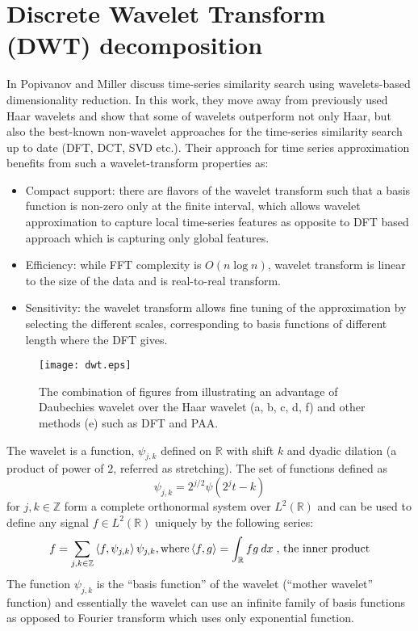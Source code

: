 \section{Discrete Wavelet Transform (DWT) decomposition}
In \cite{citeulike:3734066} Popivanov and Miller discuss time-series similarity search using wavelets-based dimensionality reduction. In this work, they move away from previously used Haar wavelets \cite{citeulike:4384535} and show that some of wavelets outperform not only Haar, but also the best-known non-wavelet approaches for the time-series similarity search up to date (DFT, DCT, SVD etc.). Their approach for time series approximation benefits from such a wavelet-transform properties as:
\begin{itemize}
	\item{Compact support: there are flavors of the wavelet transform such that a basis function is non-zero only at the finite interval, which allows wavelet approximation to capture local time-series features as opposite to DFT based approach which is capturing only global features.}
	\item{Efficiency: while FFT complexity is $O(n \log{n})$, wavelet transform is linear to the size of the data and is real-to-real transform.}
	\item{Sensitivity: the wavelet transform allows fine tuning of the approximation by selecting the different scales, corresponding to basis functions of different length where the DFT gives.}
\end{itemize}

\begin{figure}[tbp]
   \centering
   \texttt{[image: dwt.eps]}
   \caption{The combination of figures from \cite{citeulike:3734066} illustrating an advantage of Daubechies wavelet over the Haar wavelet (a, b, c, d, f) and other methods (e) such as DFT and PAA.}
   \label{fig:dwt}
\end{figure} 

The wavelet is a function, $\psi_{j,k}$ defined on $\mathbb{R}$ with shift $k$ and dyadic dilation (a product of power of $2$, referred as stretching). The set of functions defined as
\begin{equation}
\psi_{j,k} = 2^{j/2} \psi \left( 2^{j}t - k \right)  
\label{eq:wavelet}
\end{equation} 
for $j, k \in \mathbb{Z}$ form a complete orthonormal system over $L^{2}(\mathbb{R})$ and can be used to define any signal $f \in L^{2}(\mathbb{R})$ uniquely by the following series: 
\begin{equation}
f = \sum_{j, k \in \mathbb{Z}} \left\langle f, \psi_{j,k} \right\rangle  \psi_{j,k}, \\
\text{where} \left\langle f,g \right\rangle = \int_{\mathbb{R}} f g \: dx \; \text{, the inner product}
\label{eq:wavelet_series}
\end{equation} 
The function $\psi_{j,k}$ is the ``basis function'' of the wavelet (``mother wavelet'' function) and essentially the wavelet can use an infinite family of basis functions as opposed to Fourier transform which uses only exponential function. 

